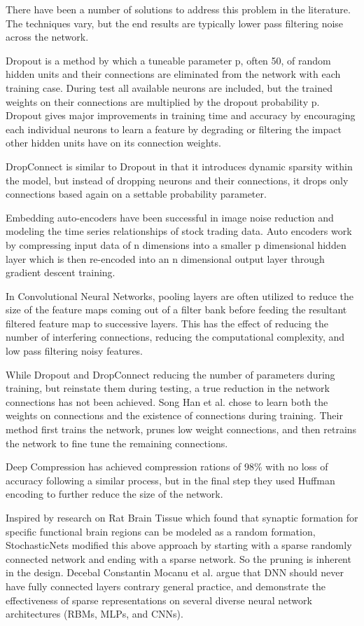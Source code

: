 \documentclass{llncs}
\begin{document}
There have been a number of solutions to address this problem in the literature.  The
techniques vary, but the end results are typically lower pass filtering noise across the
network.

Dropout is a method by which a tuneable parameter p, often 50, of random hidden units and
their connections are eliminated from the network with each training case.  During test
all available neurons are included, but the trained weights on their connections are
multiplied by the dropout probability p.    Dropout gives major improvements in training
time and accuracy by encouraging each individual neurons to learn a feature by degrading
or filtering the impact other hidden units have on its connection weights.

DropConnect is similar to Dropout in that it introduces dynamic sparsity within the
model, but instead of dropping neurons and their connections, it drops only connections
based again on a settable probability parameter.

Embedding auto-encoders have been successful in image noise reduction and modeling the
time series relationships of stock trading data.  Auto encoders work by compressing
input data of n dimensions into a smaller p dimensional hidden layer which is then
re-encoded into an n dimensional output layer through gradient descent training.

In Convolutional Neural Networks,  pooling layers are often utilized to reduce the size
of the feature maps coming out of a filter bank before feeding the resultant filtered
feature map to successive layers.  This has the effect of reducing the number of
interfering connections, reducing the computational complexity, and low pass filtering
noisy features.

While Dropout and DropConnect reducing the number of parameters during training, but
reinstate them during testing, a true reduction in the network connections has not been
achieved.   Song Han et al. chose to learn both the weights on connections and the
existence of connections during training. Their method first trains the network, prunes
low weight connections, and then retrains the network to fine tune the remaining connections.

Deep Compression has achieved compression rations of 98\% with no loss of accuracy
following a similar process, but in the final step they used Huffman encoding to further
reduce the size of the network.

Inspired by research on Rat Brain Tissue which found that synaptic formation for specific
functional brain regions can be modeled as a random formation, StochasticNets modified
this above approach by starting with a sparse randomly connected network and ending with
a sparse network.   So the pruning is inherent in the design.
Decebal Constantin Mocanu et al. argue that  DNN should never have fully connected layers
contrary general practice, and demonstrate the effectiveness of sparse representations on
several diverse neural network architectures (RBMs, MLPs, and CNNs).
\end{document}
